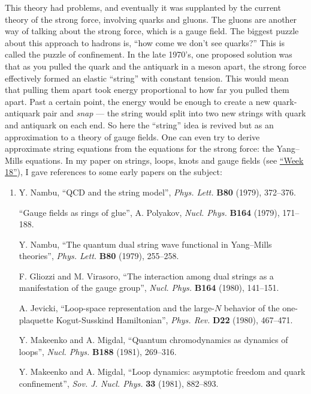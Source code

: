\documentclass{article}
\begin{document}
This theory had problems, and eventually it was supplanted by the
current theory of the strong force, involving quarks and gluons. The
gluons are another way of talking about the strong force, which is a
gauge field. The biggest puzzle about this approach to hadrons is, ``how
come we don't see quarks?'' This is called the puzzle of confinement. In
the late 1970's, one proposed solution was that as you pulled the quark
and the antiquark in a meson apart, the strong force effectively formed
an elastic ``string'' with constant tension. This would mean that
pulling them apart took energy proportional to how far you pulled them
apart. Past a certain point, the energy would be enough to create a new
quark-antiquark pair and \emph{snap} --- the string would split into two
new strings with quark and antiquark on each end. So here the ``string''
idea is revived but as an approximation to a theory of gauge fields. One
can even try to derive approximate string equations from the equations
for the strong force: the Yang--Mills equations. In my paper on strings,
loops, knots and gauge fields (see \protect\hyperlink{week18}{``Week
18''}), I gave references to some early papers on the subject:

\begin{enumerate}
\def\labelenumi{\arabic{enumi})}
\item
  Y. Nambu, ``QCD and the string model'', \emph{Phys. Lett.}
  \textbf{B80} (1979), 372--376.

  ``Gauge fields as rings of glue'', A. Polyakov, \emph{Nucl. Phys.}
  \textbf{B164} (1979), 171--188.

  Y. Nambu, ``The quantum dual string wave functional in Yang--Mills theories'', 
  \emph{Phys. Lett.} \textbf{B80} (1979),
  255--258.

  F. Gliozzi and M. Virasoro, ``The interaction among dual strings as a manifestation of the gauge
  group'', \emph{Nucl. Phys.}
  \textbf{B164} (1980), 141--151.

  A. Jevicki, ``Loop-space representation and the large-\(N\) behavior of the
  one-plaquette Kogut-Susskind Hamiltonian'', \emph{Phys.
  Rev.} \textbf{D22} (1980), 467--471.

 Y. Makeenko and A. Migdal,  ``Quantum chromodynamics as dynamics of loops'', 
  \emph{Nucl. Phys.} \textbf{B188} (1981), 269--316.

  Y.  Makeenko and A. Migdal, ``Loop dynamics: asymptotic freedom and quark confinement'', \emph{Sov. J. Nucl. Phys.} \textbf{33} (1981), 882--893.
\end{enumerate}
\end{document}
